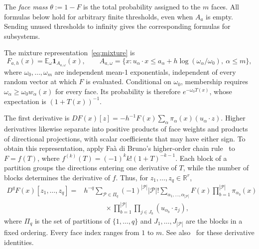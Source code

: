\documentclass[11pt,letterpaper]{article}
\theoremstyle{remark}
\newcommand{\E}{\mathbb E}
\newcommand{\R}{\mathbb R}
\newcommand{\ind}{\mathbf 1}
\begin{document}
The \emph{face mass} \(\theta:=1-F\) is the total probability assigned
to the \(m\) faces. All formulas below hold for arbitrary finite
thresholds, even when \(A_a\) is empty. Sending unused thresholds
to infinity gives the corresponding formulas for subsystems.

The mixture representation~\eqref{eq:mixture} is
\[
 F_{a,h}(x)=\E_\omega\ind_{A_{a,\omega}}(x),\qquad
 A_{a,\omega}=\{x:u_\alpha\cdot x\le
 a_\alpha+h\log(\omega_\alpha/\omega_0),\ \alpha\le m\},
\]
where \(\omega_0,\ldots,\omega_m\) are independent mean-1
exponentials, independent of every random vector at which \(F\) is
evaluated. Conditional on \(\omega_0\), membership requires
\(\omega_\alpha\ge\omega_0w_\alpha(x)\) for every face.
Its probability is therefore \(e^{-\omega_0T(x)}\), whose
expectation is \((1+T(x))^{-1}\).

The first derivative is
\(DF(x)[z]=-h^{-1}F(x)\sum_\alpha\pi_\alpha(x)(u_\alpha\cdot z)\).
Higher derivatives likewise separate into positive products of face
weights and products of directional projections, with scalar coefficients
that may have either sign. To obtain this representation, apply
Fa\`a di Bruno's higher-order chain rule~\cite{Comtet1974}
to \(F=f(T)\), where
\(f^{(k)}(T)=(-1)^k k!(1+T)^{-k-1}\). Each block of a partition
groups the directions entering one derivative of \(T\), while the
number of blocks determines the derivative of \(f\). Thus, for
\(z_1,\ldots,z_q\in\R^r\),
\begin{equation}
 \begin{split}
 D^qF(x)[z_1,\ldots,z_q]
 ={}&h^{-q}\sum_{\mathcal P\in\Pi_q}(-1)^{|\mathcal P|}|\mathcal P|!
 \sum_{\alpha_1,\ldots,\alpha_{|\mathcal P|}}
 F(x)\prod_{b=1}^{|\mathcal P|}\pi_{\alpha_b}(x)\\
 &\hspace{3em}\times
 \prod_{b=1}^{|\mathcal P|}\prod_{j\in J_b}
 (u_{\alpha_b}\cdot z_j),
 \end{split}
 \label{appx-eq:partition-derivative}
\end{equation}
where \(\Pi_q\) is the set of partitions of \(\{1,\ldots,q\}\)
and \(J_1,\ldots,J_{|\mathcal P|}\) are the blocks in a fixed
ordering. Every face index ranges from \(1\) to \(m\).
See also~\cite[Lemma~13]{GaoZhang} for these derivative identities.
\end{document}
